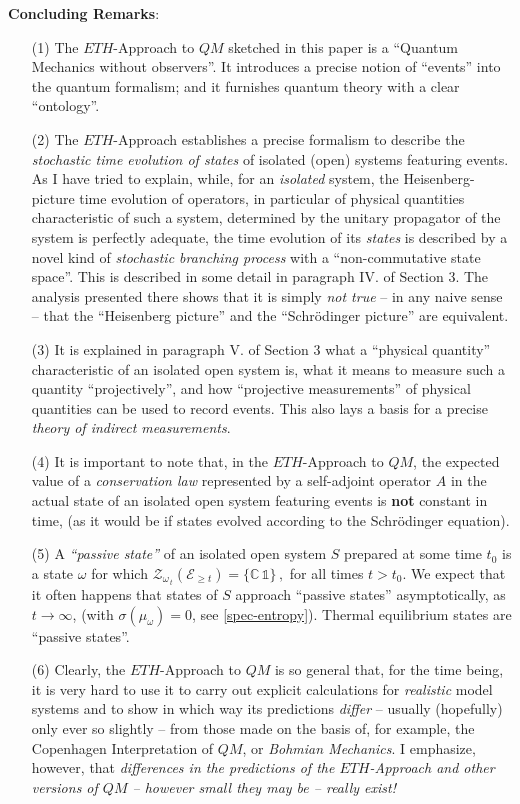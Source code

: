 \documentclass[12pt]{article}
\begin{document}
{\bf{Concluding Remarks}}:
\begin{enumerate}
\item[(1)]{The $\textit{ETH}$-Approach to $QM$ sketched in this paper is a ``Quantum Mechanics without observers''. It introduces a precise notion of ``events'' into the quantum formalism; and it furnishes quantum theory with a clear ``ontology''.}
\item[(2)]{The $\textit{ETH}$-Approach establishes a precise formalism to describe the \textit{stochastic time evolution of states} of isolated (open) systems featuring events. As I have tried to explain, while, for an \textit{isolated} system, the Heisenberg-picture time evolution of operators, in particular of physical quantities characteristic of such a system, determined by the unitary propagator of the system is perfectly adequate, the time evolution of its \textit{states} is described by a novel kind of \textit{stochastic branching process} with a ``non-commutative state space''. This is described in some detail in paragraph IV. of Section 3. The analysis presented there shows that it is simply \textit{not true} -- in any naive sense -- that the ``Heisenberg picture'' and the ``Schr\"{o}dinger picture'' are equivalent.}
\item[(3)]{It is explained in paragraph V. of Section 3 what a ``physical quantity'' characteristic of an isolated open system is, what it means to measure such a quantity ``projectively'', and how ``projective measurements'' of physical quantities can be used to record events. This also lays a basis for a precise \textit{theory of indirect measurements}.}
\item[(4)]{It is important to note that, in the $\textit{ETH}$-Approach to $QM$, the expected value of a \textit{conservation law} represented by a self-adjoint operator $A$ in the actual state of an isolated open system featuring events is {\bf{not}} constant in time, (as it would be if states evolved according to the Schr\"{o}dinger equation).}
\item[(5)]{A \textit{``passive state''} of an isolated open system $S$ prepared at some time $t_0$ is a state $\omega$ for which 
$\mathcal{Z}_{\omega_{\,t}}(\mathcal{E}_{\geq t}) = \lbrace \mathbb{C}\, \mathds{1} \rbrace\,,$ for all times $t>t_0$. We expect that it often happens that states of $S$ approach ``passive states'' asymptotically, as $t\rightarrow \infty$, (with $\sigma(\mu_{\omega})=0$, see \eqref{spec-entropy}). Thermal equilibrium states are ``passive states''.
}
\item[(6)]{Clearly, the $\textit{ETH}$-Approach to $QM$ is so general that, for the time being, it is very hard to use it to carry out explicit calculations for \textit{realistic} model systems and to show in which way its predictions \textit{differ} -- usually (hopefully) only ever so slightly -- from those made on the basis of, for example, the Copenhagen Interpretation of $QM$, or \textit{Bohmian Mechanics}. I emphasize, however, that \textit{differences in the predictions of the $\textit{ETH}$-Approach and other versions of $QM$ -- however small they may be -- really exist!}}

\end{enumerate}
\end{document}
